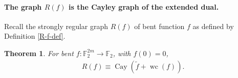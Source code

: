 \documentclass[12pt,a4paper]{article}
\newcommand{\mb}[1]{\mathbb{#1}}
\newcommand{\F}{\mb{F}}
\newcommand{\To}{\rightarrow}
\newcommand{\Cay}[1]{\operatorname{Cay}\left(#1\right)}
\newcommand{\dual}[1]{\widetilde{#1}}
\newcommand{\weightclass}[1]{\operatorname{wc}\left(#1\right)}
\newtheorem{Theorem}{Theorem}
\begin{document}
\paragraph*{The graph $R(f)$ is the Cayley graph of the extended dual.}
Recall the strongly regular graph $R(f)$ of bent function $f$ as defined by Definition
\ref{R-f-def}.

\begin{Theorem}
For bent $f : \F_2^{2m} \To \F_2$, with $f(0)=0$,
\begin{align*}
R(f) \equiv \Cay{\dual{f} + \weightclass{f}}.
\end{align*}

\end{Theorem}
\end{document}
